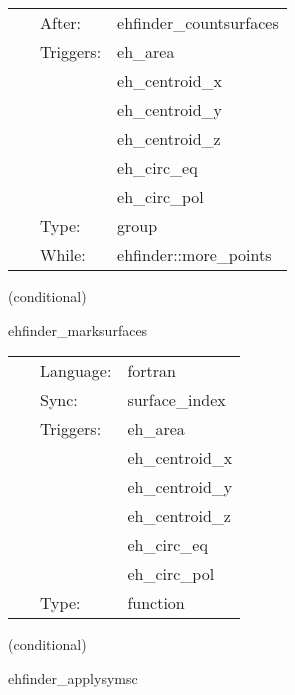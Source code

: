  \begin{tabular*}{160mm}{cll} 
~ & After:  & ehfinder\_countsurfaces \\ 
~ & Triggers:  & eh\_area \\ 
~& ~ &eh\_centroid\_x\\ 
~& ~ &eh\_centroid\_y\\ 
~& ~ &eh\_centroid\_z\\ 
~& ~ &eh\_circ\_eq\\ 
~& ~ &eh\_circ\_pol\\ 
~ & Type:  & group \\ 
~ & While:  & ehfinder::more\_points \\ 
\end{tabular*} 


\vspace{5mm}

   (conditional) 

\hspace{5mm} ehfinder\_marksurfaces 

\hspace{5mm}{\it mark points inside the current surface } 


\hspace{5mm}

 \begin{tabular*}{160mm}{cll} 
~ & Language:  & fortran \\ 
~ & Sync:  & surface\_index \\ 
~ & Triggers:  & eh\_area \\ 
~& ~ &eh\_centroid\_x\\ 
~& ~ &eh\_centroid\_y\\ 
~& ~ &eh\_centroid\_z\\ 
~& ~ &eh\_circ\_eq\\ 
~& ~ &eh\_circ\_pol\\ 
~ & Type:  & function \\ 
\end{tabular*} 


\vspace{5mm}

   (conditional) 

\hspace{5mm} ehfinder\_applysymsc 

\hspace{5mm}{\it select the surface counter grid function for boundary conditions } 


\hspace{5mm}

